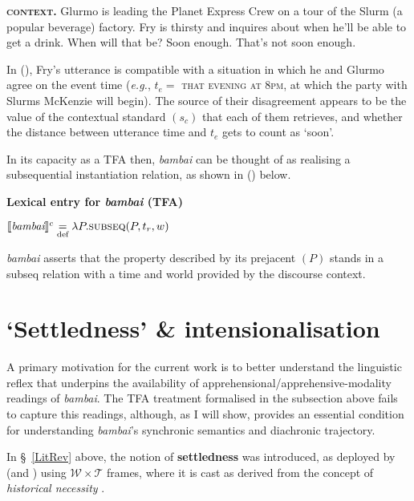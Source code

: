 \pex[labelwidth=3.5em] \textbf{\textsc{context.}} Glurmo is leading the Planet Express Crew on a tour of the Slurm (a popular beverage) factory. Fry is thirsty and inquires about when he'll be able to get a drink.
\a[label=\textbf{Fry}] When will that be?
\a[label=\textbf{Glurmo}] Soon enough.
\a[label=\textbf{Fry}] That's not soon enough.
\xe

In (), Fry's utterance is compatible with a situation in which he and Glurmo agree on the event time (\textit{e.g.}, $ t_e  =$ \textsc{that evening at 8pm}, at which the party with Slurms McKenzie will begin). The source of their disagreement appears to be the value of the contextual standard $ (s_c) $ that each of them retrieves, and whether the distance between utterance time and $ t_e $ gets to count as `soon'.
	
	In its capacity as a TFA then, \textit{bambai} can be thought of as realising a subsequential instantiation relation, as shown in (\nextx) below.
	
\pex \textbf{Lexical entry for \textit{bambai} (\gls{TFA})}

	$\denote[c]{\textit{bambai}}\underset{\text{def}}{=}\lambda P.\text{{\sc subseq}}(P,t_r,w)$

\textit{bambai} asserts that the property described by its prejacent $ (P) $ stands in a {\sc subseq} relation with a time and world provided by the discourse context.
\xe
	
	
	\section{`Settledness' \& intensionalisation}\label{modSems}
	
A primary motivation for the current work is to better understand the linguistic reflex that underpins the availability of apprehensional/apprehensive-modality readings of \textit{bambai}. The TFA treatment formalised in the subsection above fails to capture this readings, although, as I will show, provides an essential condition for understanding \textit{bambai}'s synchronic semantics and diachronic trajectory.

In §~\ref{LitRev} above, the notion of \textbf{settledness} was introduced, as deployed by \citet{Condoravdi2002} (and \citealp{Kaufmann2005}) using $ \mathcal{W\times T} $ frames, where it is cast as derived from the concept of \textit{historical necessity} \citep{Thomason1970}. 

